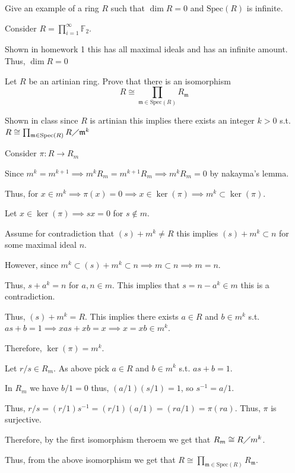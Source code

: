 \documentclass[12pt, letterpaper]{article}
\newcommand{\F}{\mathbb{F}}
\newcommand{\Spec}{\mathrm{Spec}}
\newcommand{\mf}[1]{\mathfrak{#1}}
\begin{document}
\begin{problem}{}
    Give an example of a ring $R$ such that $\dim R = 0$ and $\Spec(R)$ is infinite.
\end{problem}
\begin{problemproof}
    Consider $R = \prod_{i=1}^\infty \F_2$.

    Shown in homework 1 this has all maximal ideals and has an infinite amount. Thus, $\dim R=0$
\end{problemproof}

\begin{problem}{}
    Let $R$ be an artinian ring. Prove that there is an isomorphism
    \[R \cong \prod_{\mf{m} \in \Spec(R)} R_{\mf{m}}\]
\end{problem}
\begin{problemproof}
    Shown in class since $R$ is artinian this implies there exists an integer $k > 0$ s.t. $R \cong \prod_{\mf{m} \in \Spec(R)} R \diagup \mf{m}^k$

    Consider $\pi : R \to R_m$

    Since $m^k = m^{k+1} \implies m^k R_m = m^{k+1}R_m \implies m^kR_m =0$ by nakayma's lemma.

    Thus, for $x \in m^k \implies \pi(x)=0 \implies x \in \ker(\pi) \implies m^k \subset \ker(\pi)$.

    Let $x \in \ker(\pi) \implies sx = 0$ for $s \notin m$.

    Assume for contradiction that $(s)+m^k \neq R$ this implies $(s) + m^k \subset n$ for some maximal ideal $n$.

    However, since $m^k \subset (s)+m^k \subset n \implies m \subset n \implies m=n$.

    Thus, $s+a^k=n$ for $a,n \in m$. This implies that $s=n-a^k \in m$ this is a contradiction.

    Thus, $(s)+m^k = R$. This implies there exists $a \in R$ and $b \in m^k$ s.t. $as+b=1 \implies xas+xb=x \implies x=xb \in m^k$.

    Therefore, $\ker(\pi) = m^k$.

    Let $r/s \in R_m$. As above pick $a \in R$ and $b \in m^k$ s.t. $as+b=1$.

    In $R_m$ we have $b/1 = 0$ thus, $(a/1)(s/1)=1$, so $s^{-1}=a/1$.

    Thus, $r/s=(r/1)s^{-1}=(r/1)(a/1)=(ra/1)= \pi(ra)$. Thus, $\pi$ is surjective.

    Therefore, by the first isomorphism theroem we get that $R_m \cong R \diagup m^k$.

    Thus, from the above isomorphism we get that $R \cong \prod_{\mf{m} \in \Spec(R)} R_\mf{m}$.
\end{problemproof}
\end{document}
